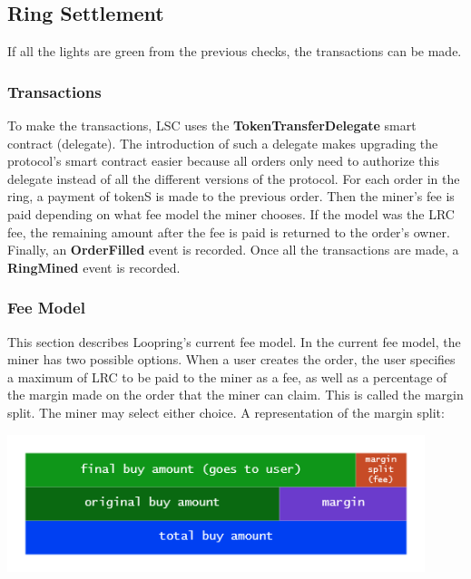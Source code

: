 \documentclass[UTF8,nofonts]{article}
\makeatletter
\newenvironment{figurehere}
 {\def\@captype{figure}}
 {}
\makeatother
\begin{document}
\subsection{Ring Settlement}
If all the lights are green from the previous checks, the transactions can be made.
\subsubsection{Transactions}
To make the transactions, LSC uses the \textbf{TokenTransferDelegate} smart contract (delegate). The introduction of such a delegate makes upgrading the protocol’s smart contract easier because all orders only need to authorize this delegate instead of all the different versions of the protocol.
For each order in the ring, a payment of tokenS is made to the previous order. Then the miner's fee is paid depending on what fee model the miner chooses. If the model was the LRC fee, the remaining amount after the fee is paid is returned to the order's owner. Finally, an \textbf{OrderFilled} event is recorded.
Once all the transactions are made, a \textbf{RingMined} event is recorded.
\subsubsection{Fee Model}

This section describes Loopring’s current fee model.
In the current fee model, the miner has two possible options. When a user creates the order, the user specifies a maximum of LRC to be paid to the miner as a fee, as well as a percentage of the margin made on the order that the miner can claim. This is called the margin split. The miner may select either choice.
A representation of the margin split:
\begin{center}
\begin{figurehere}
\includegraphics[height=4cm]{images/margin-split.png}
\label{fig: Loopringrotocol}
\end{figurehere}
\end{center}
\end{document}
